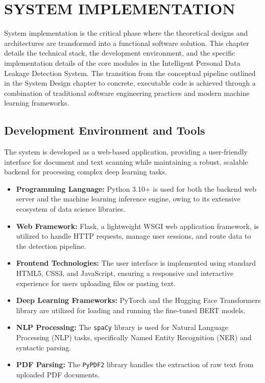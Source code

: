 ﻿\chapter{SYSTEM IMPLEMENTATION}
\thispagestyle{fancy}
\hspace{0.5cm}
System implementation is the critical phase where the theoretical designs and architectures are transformed into a functional software solution. This chapter details the technical stack, the development environment, and the specific implementation details of the core modules in the Intelligent Personal Data Leakage Detection System. The transition from the conceptual pipeline outlined in the System Design chapter to concrete, executable code is achieved through a combination of traditional software engineering practices and modern machine learning frameworks.

\section{Development Environment and Tools}
\par The system is developed as a web-based application, providing a user-friendly interface for document and text scanning while maintaining a robust, scalable backend for processing complex deep learning tasks.
\begin{itemize}
    \item \textbf{Programming Language:} Python 3.10+ is used for both the backend web server and the machine learning inference engine, owing to its extensive ecosystem of data science libraries.
    \item \textbf{Web Framework:} Flask, a lightweight WSGI web application framework, is utilized to handle HTTP requests, manage user sessions, and route data to the detection pipeline.
    \item \textbf{Frontend Technologies:} The user interface is implemented using standard HTML5, CSS3, and JavaScript, ensuring a responsive and interactive experience for users uploading files or pasting text.
    \item \textbf{Deep Learning Frameworks:} PyTorch and the Hugging Face Transformers library are utilized for loading and running the fine-tuned BERT models.
    \item \textbf{NLP Processing:} The \texttt{spaCy} library is used for Natural Language Processing (NLP) tasks, specifically Named Entity Recognition (NER) and syntactic parsing.
    \item \textbf{PDF Parsing:} The \texttt{PyPDF2} library handles the extraction of raw text from uploaded PDF documents.
\end{itemize}

